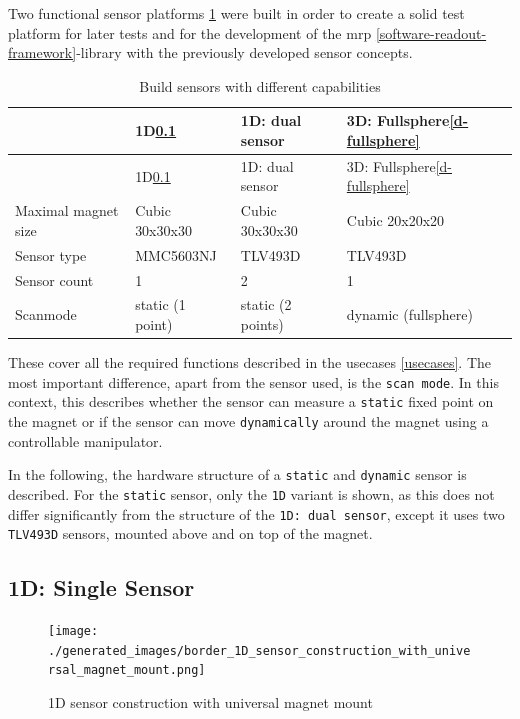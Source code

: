 Two functional sensor platforms
\ref{Build_sensors_with_different_capabilities.csv} were built in order
to create a solid test platform for later tests and for the development
of the \gls{mrp} \ref{software-readout-framework}-library with the
previously developed sensor concepts.

\begin{longtable}[]{@{}llll@{}}
\caption{Build sensors with different capabilities
\label{Build_sensors_with_different_capabilities.csv}}\tabularnewline
\toprule
& 1D\ref{d-single-sensor} & 1D: dual sensor & 3D:
Fullsphere\ref{d-fullsphere}\tabularnewline
\midrule
\endfirsthead
\toprule
& 1D\ref{d-single-sensor} & 1D: dual sensor & 3D:
Fullsphere\ref{d-fullsphere}\tabularnewline
\midrule
\endhead
Maximal magnet size & Cubic 30x30x30 & Cubic 30x30x30 & Cubic
20x20x20\tabularnewline
Sensor type & MMC5603NJ & TLV493D & TLV493D\tabularnewline
Sensor count & 1 & 2 & 1\tabularnewline
Scanmode & static (1 point) & static (2 points) & dynamic
(fullsphere)\tabularnewline
\bottomrule
\end{longtable}

These cover all the required functions described in the usecases
\ref{usecases}. The most important difference, apart from the sensor
used, is the \passthrough{\lstinline!scan mode!}. In this context, this
describes whether the sensor can measure a
\passthrough{\lstinline!static!} fixed point on the magnet or if the
sensor can move \passthrough{\lstinline!dynamically!} around the magnet
using a controllable manipulator.

In the following, the hardware structure of a
\passthrough{\lstinline!static!} and \passthrough{\lstinline!dynamic!}
sensor is described. For the \passthrough{\lstinline!static!} sensor,
only the \passthrough{\lstinline!1D!} variant is shown, as this does not
differ significantly from the structure of the
\passthrough{\lstinline!1D: dual sensor!}, except it uses two
\passthrough{\lstinline!TLV493D!} sensors, mounted above and on top of
the magnet.

\hypertarget{d-single-sensor}{%
\subsection{1D: Single Sensor}\label{d-single-sensor}}

\begin{figure}
\centering
\texttt{[image: ./generated\_images/border\_1D\_sensor\_construction\_with\_universal\_magnet\_mount.png]}
\caption{1D sensor construction with universal magnet mount
\label{1D_sensor_construction_with_universal_magnet_mount.png}}
\end{figure}

